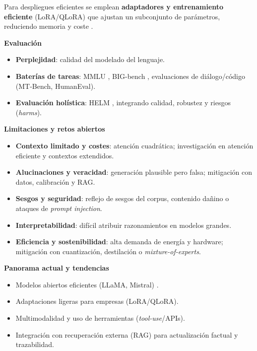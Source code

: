 Para despliegues eficientes se emplean \textbf{adaptadores y entrenamiento eficiente} (LoRA/QLoRA) que ajustan un subconjunto de parámetros, reduciendo memoria y coste \cite{Hu2021,Dettmers2023}.

\vspace{0.3cm}
\textbf{Evaluación} 
\begin{itemize}
    \item \textbf{Perplejidad}: calidad del modelado del lenguaje.
    \item \textbf{Baterías de tareas}: MMLU \cite{Hendrycks2021}, BIG-bench \cite{Srivastava2022}, evaluaciones de diálogo/código (MT-Bench, HumanEval).
    \item \textbf{Evaluación holística}: HELM \cite{Liang2022}, integrando calidad, robustez y riesgos (\textit{harms}).
\end{itemize}

\vspace{0.3cm}
\textbf{Limitaciones y retos abiertos} 
\begin{itemize}
    \item \textbf{Contexto limitado y costes}: atención cuadrática; investigación en atención eficiente y contextos extendidos.
    \item \textbf{Alucinaciones y veracidad}: generación plausible pero falsa; mitigación con datos, calibración y RAG.
    \item \textbf{Sesgos y seguridad}: reflejo de sesgos del corpus, contenido dañino o ataques de \textit{prompt injection}.
    \item \textbf{Interpretabilidad}: difícil atribuir razonamientos en modelos grandes.
    \item \textbf{Eficiencia y sostenibilidad}: alta demanda de energía y hardware; mitigación con cuantización, destilación o \textit{mixture-of-experts}.
\end{itemize}

\vspace{0.3cm}
\textbf{Panorama actual y tendencias} 
\begin{itemize}
    \item Modelos abiertos eficientes (LLaMA, Mistral) \cite{Touvron2023}.
    \item Adaptaciones ligeras para empresas (LoRA/QLoRA).
    \item Multimodalidad y uso de herramientas (\textit{tool-use}/APIs).
    \item Integración con recuperación externa (RAG) para actualización factual y trazabilidad.
\end{itemize}



